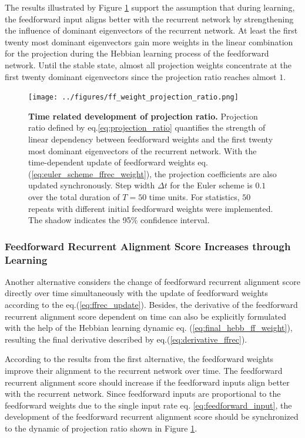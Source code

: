 \documentclass[11pt]{article}
\begin{document}
	The results illustrated by Figure \ref{fig:projection_ratio_in_time} support the assumption that during learning, the feedforward input aligns better with the recurrent network by strengthening the influence of dominant eigenvectors of the recurrent network. At least the first twenty most dominant eigenvectors gain more weights in the linear combination for the projection during the Hebbian learning process of the feedforward network. Until the stable state, almost all projection weights concentrate at the first twenty dominant eigenvectors since the projection ratio reaches almost $1$. %
	
		\begin{figure}
			\centering
			\texttt{[image: ../figures/ff\_weight\_projection\_ratio.png]}
			\caption{\textbf{Time related development of projection ratio.} Projection ratio defined by eq.\ref{eq:projection_ratio} quantifies the strength of linear dependency between feedforward weights and the first twenty most dominant eigenvectors of the recurrent network. With the time-dependent update of feedforward weights eq.(\ref{eq:euler_scheme_ffrec_weight}), the projection coefficients are also updated synchronously. Step width $\Delta t$ for the Euler scheme is $0.1$ over the total duration of $T=50$ time units. For statistics, $50$ repeats with different initial feedforward weights were implemented. The shadow indicates the 95\% confidence interval.}
			\label{fig:projection_ratio_in_time}
		\end{figure}
	
	\subsubsection{Feedforward Recurrent Alignment Score Increases through Learning}
	
	Another alternative considers the change of feedforward recurrent alignment score directly over time simultaneously with the update of feedforward weights according to the eq.(\ref{eq:ffrec_update}). Besides, the derivative of the feedforward recurrent alignment score dependent on time can also be explicitly formulated with the help of the Hebbian learning dynamic eq. (\ref{eq:final_hebb_ff_weight}), resulting the final derivative described by eq.(\ref{eq:derivative_ffrec}). 
	
	According to the results from the first alternative, the feedforward weights improve their alignment to the recurrent network over time. The feedforward recurrent alignment score should increase if the feedforward inputs align better with the recurrent network. Since feedforward inputs are proportional to the feedforward weights due to the single input rate eq. \ref{eq:feedforward_input}, the development of the feedforward recurrent alignment score should be synchronized to the dynamic of projection ratio shown in Figure \ref{fig:projection_ratio_in_time}. 
	
\end{document}
